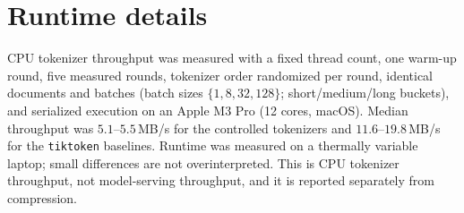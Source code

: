 \section{Runtime details}
\label{app:runtime}
CPU tokenizer throughput was measured with a fixed thread count, one warm-up round,
five measured rounds, tokenizer order randomized per round, identical documents and
batches (batch sizes $\{1,8,32,128\}$; short/medium/long buckets), and serialized
execution on an Apple M3 Pro (12 cores, macOS). Median throughput was
$5.1$--$5.5$\,MB/s for the controlled tokenizers and $11.6$--$19.8$\,MB/s for the
\texttt{tiktoken} baselines. Runtime was measured on a thermally variable laptop;
small differences are not overinterpreted. This is CPU tokenizer throughput, not
model-serving throughput, and it is reported separately from compression.

